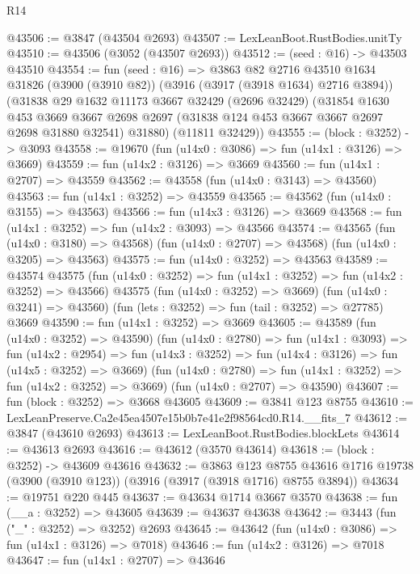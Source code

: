 \begin{lexlean}{R14}
\begin{coremodule}
@43506 := @3847 (@43504 @2693)
@43507 := LexLeanBoot.RustBodies.unitTy
@43510 := @43506 (@3052 (@43507 @2693))
@43512 := (seed : @16) -> @43503 @43510
@43554 := fun (seed : @16) =>
  @3863
    @82
    @2716
    @43510
    @1634
    @31826
    (@3900 (@3910 @82))
    (@3916 (@3917 (@3918 @1634) @2716 @3894))
    (@31838
      @29
      @1632
      @11173
      @3667
      @32429
      (@2696 @32429)
      (@31854
        @1630
        @453
        @3669
        @3667
        @2698
        @2697
        (@31838 @124 @453 @3667 @3667 @2697 @2698 @31880 @32541)
        @31880)
      (@11811 @32429))
@43555 := (block : @3252) -> @3093
@43558 := @19670 (fun (u14x0 : @3086) => fun (u14x1 : @3126) => @3669)
@43559 := fun (u14x2 : @3126) => @3669
@43560 := fun (u14x1 : @2707) => @43559
@43562 := @43558 (fun (u14x0 : @3143) => @43560)
@43563 := fun (u14x1 : @3252) => @43559
@43565 := @43562 (fun (u14x0 : @3155) => @43563)
@43566 := fun (u14x3 : @3126) => @3669
@43568 := fun (u14x1 : @3252) => fun (u14x2 : @3093) => @43566
@43574 := @43565
    (fun (u14x0 : @3180) => @43568)
    (fun (u14x0 : @2707) => @43568)
    (fun (u14x0 : @3205) => @43563)
@43575 := fun (u14x0 : @3252) => @43563
@43589 := @43574
    @43575
    (fun (u14x0 : @3252) => fun (u14x1 : @3252) => fun (u14x2 : @3252) => @43566)
    @43575
    (fun (u14x0 : @3252) => @3669)
    (fun (u14x0 : @3241) => @43560)
    (fun (lets : @3252) => fun (tail : @3252) => @27785)
    @3669
@43590 := fun (u14x1 : @3252) => @3669
@43605 := @43589
    (fun (u14x0 : @3252) => @43590)
    (fun (u14x0 : @2780) =>
    fun (u14x1 : @3093) =>
    fun (u14x2 : @2954) =>
    fun (u14x3 : @3252) => fun (u14x4 : @3126) => fun (u14x5 : @3252) => @3669)
    (fun (u14x0 : @2780) => fun (u14x1 : @3252) => fun (u14x2 : @3252) => @3669)
    (fun (u14x0 : @2707) => @43590)
@43607 := fun (block : @3252) => @3668 @43605
@43609 := @3841 @123 @8755
@43610 := LexLeanPreserve.Ca2e45ea4507e15b0b7e41e2f98564cd0.R14.__fits_7
@43612 := @3847 (@43610 @2693)
@43613 := LexLeanBoot.RustBodies.blockLets
@43614 := @43613 @2693
@43616 := @43612 (@3570 @43614)
@43618 := (block : @3252) -> @43609 @43616
@43632 := @3863
    @123
    @8755
    @43616
    @1716
    @19738
    (@3900 (@3910 @123))
    (@3916 (@3917 (@3918 @1716) @8755 @3894))
@43634 := @19751 @220 @445
@43637 := @43634 @1714 @3667 @3570
@43638 := fun (__a : @3252) => @43605
@43639 := @43637 @43638
@43642 := @3443 (fun ("_" : @3252) => @3252) @2693
@43645 := @43642 (fun (u14x0 : @3086) => fun (u14x1 : @3126) => @7018)
@43646 := fun (u14x2 : @3126) => @7018
@43647 := fun (u14x1 : @2707) => @43646

\end{coremodule}
\end{lexlean}

